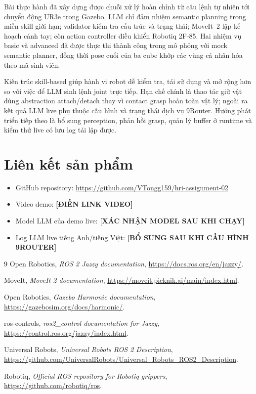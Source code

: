 \documentclass[12pt,a4paper]{article}
\begin{document}
Bài thực hành đã xây dựng được chuỗi xử lý hoàn chỉnh từ câu lệnh tự nhiên tới chuyển động UR3e trong Gazebo. LLM chỉ đảm nhiệm semantic planning trong miền skill giới hạn; validator kiểm tra cấu trúc và trạng thái; MoveIt~2 lập kế hoạch cánh tay; còn action controller điều khiển Robotiq 2F-85. Hai nhiệm vụ basic và advanced đã được thực thi thành công trong mô phỏng với mock semantic planner, đồng thời pose cuối của ba cube khớp các vùng cá nhân hóa theo mã sinh viên.

Kiến trúc skill-based giúp hành vi robot dễ kiểm tra, tái sử dụng và mở rộng hơn so với việc để LLM sinh lệnh joint trực tiếp. Hạn chế chính là thao tác giữ vật dùng abstraction attach/detach thay vì contact grasp hoàn toàn vật lý; ngoài ra kết quả LLM live phụ thuộc cấu hình và trạng thái dịch vụ 9Router. Hướng phát triển tiếp theo là bổ sung perception, phản hồi grasp, quản lý buffer ở runtime và kiểm thử live có lưu log tái lập được.

\section*{Liên kết sản phẩm}

\begin{itemize}
  \item GitHub repository: \url{https://github.com/VTongg159/hri-assignment-02}
  \item Video demo: \textbf{[ĐIỀN LINK VIDEO]}
  \item Model LLM của demo live: \textbf{[XÁC NHẬN MODEL SAU KHI CHẠY]}
  \item Log LLM live tiếng Anh/tiếng Việt: \textbf{[BỔ SUNG SAU KHI CẤU HÌNH 9ROUTER]}
\end{itemize}

\begin{thebibliography}{9}
  Open Robotics, \emph{ROS 2 Jazzy documentation},
  \url{https://docs.ros.org/en/jazzy/}.

  MoveIt, \emph{MoveIt 2 documentation},
  \url{https://moveit.picknik.ai/main/index.html}.

  Open Robotics, \emph{Gazebo Harmonic documentation},
  \url{https://gazebosim.org/docs/harmonic/}.

  ros-controls, \emph{ros2\_control documentation for Jazzy},
  \url{https://control.ros.org/jazzy/index.html}.

  Universal Robots, \emph{Universal Robots ROS 2 Description},
  \url{https://github.com/UniversalRobots/Universal_Robots_ROS2_Description}.

  Robotiq, \emph{Official ROS repository for Robotiq grippers},
  \url{https://github.com/robotiq/ros}.
\end{thebibliography}
\end{document}
